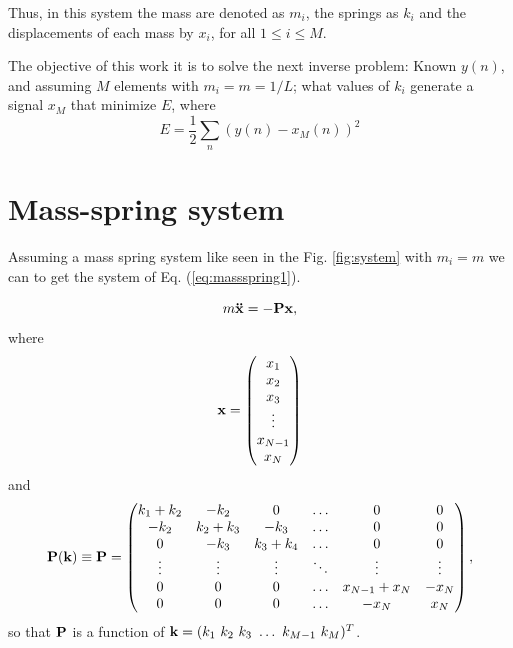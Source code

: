 \documentclass[11pt,twoside,a4paper]{article}
\newcommand{\MATRIX}[1]{\mathbf{\uppercase{#1}}}
\newcommand{\VECTOR}[1]{\mathbf{\lowercase{#1}}}
\begin{document}
Thus, in this system the mass are denoted as $m_i$, the springs as $k_i$ and the
displacements of each mass by $x_i$, for all $1 \leq  i\leq M$.

The objective of this work it is to solve the next inverse problem: Known $y(n)$, 
and assuming $M$ elements with $m_i=m=1/L$; 
what values of $k_i$ generate a signal $x_M$ that minimize $E$, 
where
\begin{equation}\label{eq:inverseproblem}
 E=\frac{1}{2}\sum_{n} (y(n)-x_M(n))^2
\end{equation} 

\section{Mass-spring system}
Assuming a mass spring system like seen in the Fig. \ref{fig:system} with $m_i=m$
we can to get the system of Eq. (\ref{eq:massspring1}).

\begin{equation}\label{eq:massspring1}
 m \VECTOR{\ddot{X}} = -\MATRIX{P} \VECTOR{X},
\end{equation}
where
\begin{equation}\label{eq:X}
 \VECTOR{X} = \left( 
 \begin{matrix}
 x_1\\
 x_2\\ 
 x_3\\ 
 \vdots \\
 x_{N-1}\\
 x_N\\
 \end{matrix}
\right)
\end{equation}
and 
\begin{equation}\label{eq:P}
 \MATRIX{P}(\VECTOR{k}) \equiv \MATRIX{P} = \left( 
 \begin{matrix}
 k_1+k_2 & -k_2    & 0       &  \hdots & 0           & 0  \\
 -k_2    & k_2+k_3 & -k_3    &  \hdots & 0           & 0  \\
 0       &    -k_3 & k_3+k_4 &  \hdots & 0           & 0  \\
 \vdots  & \vdots  & \vdots  &  \ddots & \vdots      & \vdots \\
 0       & 0       & 0       &  \hdots & x_{N-1}+x_N & -x_N  \\
 0       & 0       & 0       &  \hdots & -x_N        & x_N  \\
 \end{matrix}
\right),
\end{equation}
so that $\MATRIX{P}$ is a function of $\VECTOR{k}=( k_1~ k_2~ k_3~ \hdots ~ k_{M-1}~ k_M)^{T}$.
\end{document}
